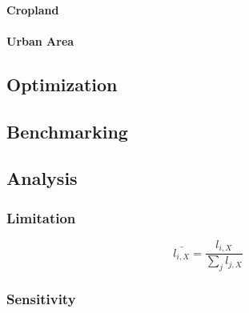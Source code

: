 \paragraph{Cropland}

\paragraph{Urban Area}


\subsection{Optimization}

\subsection{Benchmarking}


\subsection{Analysis}


\subsubsection{Limitation}

\begin{equation}
    \bar{l_{i, X}} = \frac{l_{i, X}}{\sum_{j} l_{j, X}}
\end{equation}

\subsubsection{Sensitivity}


